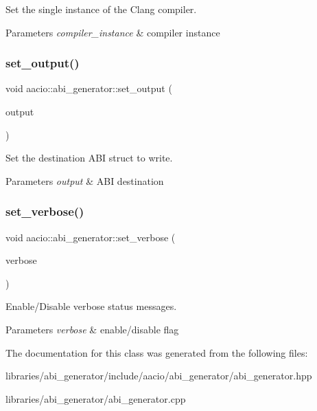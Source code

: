Set the single instance of the Clang compiler. 


\begin{DoxyParams}{Parameters}
{\em compiler\+\_\+instance} & compiler instance \\
\hline
\end{DoxyParams}
\mbox{\label{classaacio_1_1abi__generator_a09053d5b188493c36b9b39ae0a30f737}} 
\subsubsection{\texorpdfstring{set\+\_\+output()}{set\_output()}}
{\footnotesize\ttfamily void aacio\+::abi\+\_\+generator\+::set\+\_\+output (\begin{DoxyParamCaption}\item[{\mbox{\hyperlink{structaacio_1_1chain_1_1contracts_1_1abi__def}{abi\+\_\+def}} \&}]{output }\end{DoxyParamCaption})}



Set the destination A\+BI struct to write. 


\begin{DoxyParams}{Parameters}
{\em output} & A\+BI destination \\
\hline
\end{DoxyParams}
\mbox{\label{classaacio_1_1abi__generator_a8e0112db8062948a939b3db83d0e0884}} 
\subsubsection{\texorpdfstring{set\+\_\+verbose()}{set\_verbose()}}
{\footnotesize\ttfamily void aacio\+::abi\+\_\+generator\+::set\+\_\+verbose (\begin{DoxyParamCaption}\item[{bool}]{verbose }\end{DoxyParamCaption})}



Enable/\+Disable verbose status messages. 


\begin{DoxyParams}{Parameters}
{\em verbose} & enable/disable flag \\
\hline
\end{DoxyParams}


The documentation for this class was generated from the following files\+:\begin{DoxyCompactItemize}
\item 
libraries/abi\+\_\+generator/include/aacio/abi\+\_\+generator/abi\+\_\+generator.\+hpp\item 
libraries/abi\+\_\+generator/abi\+\_\+generator.\+cpp\end{DoxyCompactItemize}
